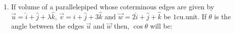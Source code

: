 \documentclass[journal,12pt,onecolumn]{IEEEtran}
\theoremstyle{remark}
\begin{document}
\begin{enumerate}
\item If volume of a parallelepiped whose coterminous edges are given by\newline
$\overrightarrow{u} = \hat{i}+\hat{j}+\lambda\hat{k}$,\newline
$\overrightarrow{v} = \hat{i}+\hat{j}+3\hat{k}$ and\newline
$\overrightarrow{w} = 2\hat{i}+\hat{j}+\hat{k}$\newline
be $1$cu.unit. If $\theta$ is the angle between the edges $\overrightarrow{u}$ and $\overrightarrow{w}$ then, $\cos\theta$ will be:
\begin{enumerate}
\end{enumerate}

\end{enumerate}
\end{document}
